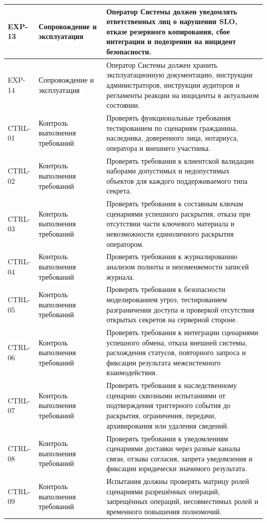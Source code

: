 \begin{longtable}{|P{1.45cm}|P{3.35cm}|P{10.7cm}|}
EXP-13 & Сопровождение и эксплуатация & Оператор Системы должен уведомлять ответственных лиц о нарушении SLO, отказе резервного копирования, сбое интеграции и подозрении на инцидент безопасности.\\ \hline
EXP-14 & Сопровождение и эксплуатация & Оператор Системы должен хранить эксплуатационную документацию, инструкции администраторов, инструкции аудиторов и регламенты реакции на инциденты в актуальном состоянии.\\ \hline
CTRL-01 & Контроль выполнения требований & Проверять функциональные требования тестированием по сценариям гражданина, наследника, доверенного лица, нотариуса, оператора и внешнего участника.\\ \hline
CTRL-02 & Контроль выполнения требований & Проверять требования к клиентской валидации наборами допустимых и недопустимых объектов для каждого поддерживаемого типа секрета.\\ \hline
CTRL-03 & Контроль выполнения требований & Проверять требования к составным ключам сценариями успешного раскрытия, отказа при отсутствии части ключевого материала и невозможности единоличного раскрытия оператором.\\ \hline
CTRL-04 & Контроль выполнения требований & Проверять требования к журналированию анализом полноты и неизменяемости записей журнала.\\ \hline
CTRL-05 & Контроль выполнения требований & Проверять требования к безопасности моделированием угроз, тестированием разграничения доступа и проверкой отсутствия открытых секретов на серверной стороне.\\ \hline
CTRL-06 & Контроль выполнения требований & Проверять требования к интеграции сценариями успешного обмена, отказа внешней системы, расхождения статусов, повторного запроса и фиксации результата межсистемного взаимодействия.\\ \hline
CTRL-07 & Контроль выполнения требований & Проверять требования к наследственному сценарию сквозными испытаниями от подтверждения триггерного события до раскрытия, ограничения, передачи, архивирования или удаления сведений.\\ \hline
CTRL-08 & Контроль выполнения требований & Проверять требования к уведомлениям сценариями доставки через разные каналы связи, отзыва согласия, запрета уведомления и фиксации юридически значимого результата.\\ \hline
CTRL-09 & Контроль выполнения требований & Испытания должны проверять матрицу ролей сценариями разрешённых операций, запрещённых операций, несовместимых ролей и временного повышения полномочий.\\ \hline

\end{longtable}
